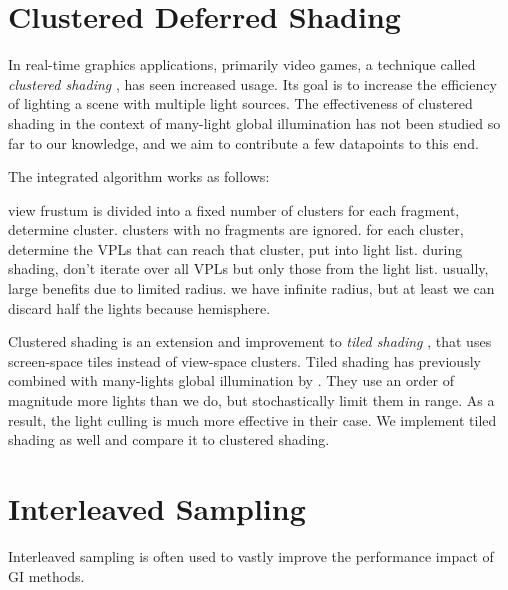 \section{Clustered Deferred Shading}
\label{sec:concept:clusteredShading}

In real-time graphics applications, primarily video games, a technique called \textit{clustered shading} \citep{olsson2012clustered}, has seen increased usage. Its goal is to increase the efficiency of lighting a scene with multiple light sources.
The effectiveness of clustered shading in the context of many-light global illumination has not been studied so far to our knowledge, and we aim to contribute a few datapoints to this end.

The integrated algorithm works as follows:
\begin{outline}
\1 view frustum is divided into a fixed number of clusters
\1 for each fragment, determine cluster. clusters with no fragments are ignored.
\1 for each cluster, determine the VPLs that can reach that cluster, put into light list.
\1 during shading, don't iterate over all VPLs but only those from the light list.
\1 usually, large benefits due to limited radius. we have infinite radius, but at least we can discard half the lights because hemisphere.
\end{outline}

Clustered shading is an extension and improvement to \textit{tiled shading} \citep{Olsson:2011:TiledShading}, that uses screen-space tiles instead of view-space clusters. Tiled shading has previously combined with many-lights global illumination by \citet{Tokuyoshi:2016:Stochastic}. They use an order of magnitude more lights than we do, but stochastically limit them in range. As a result, the light culling is much more effective in their case.
We implement tiled shading as well and compare it to clustered shading.


\section{Interleaved Sampling}
\label{sec:concept:interleavedSampling}
Interleaved sampling \citep{Keller:2001:InterleavedSampling} is often used to vastly improve the performance impact of GI methods.

